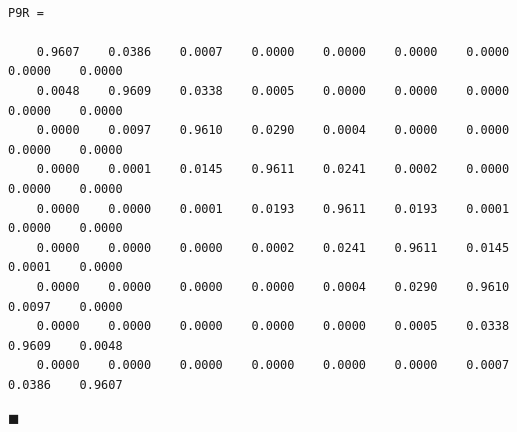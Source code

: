 \documentclass[10pt]{article}
\newcommand*{\QEDA}{\hfill\ensuremath{\blacksquare}}%
\newcommand\0{\mathbf{0}}
\newenvironment{sol}
    {\\[1em] {\color{magenta}\text{Resposta.}}
    }
    {{\color{blue!50!black}\QEDA}}
\begin{document}
\begin{enumerate}[label = 5.\arabic*., wide]
\begin{sol}
\begin{lstlisting}
P9R =

    0.9607    0.0386    0.0007    0.0000    0.0000    0.0000    0.0000    0.0000    0.0000
    0.0048    0.9609    0.0338    0.0005    0.0000    0.0000    0.0000    0.0000    0.0000
    0.0000    0.0097    0.9610    0.0290    0.0004    0.0000    0.0000    0.0000    0.0000
    0.0000    0.0001    0.0145    0.9611    0.0241    0.0002    0.0000    0.0000    0.0000
    0.0000    0.0000    0.0001    0.0193    0.9611    0.0193    0.0001    0.0000    0.0000
    0.0000    0.0000    0.0000    0.0002    0.0241    0.9611    0.0145    0.0001    0.0000
    0.0000    0.0000    0.0000    0.0000    0.0004    0.0290    0.9610    0.0097    0.0000
    0.0000    0.0000    0.0000    0.0000    0.0000    0.0005    0.0338    0.9609    0.0048
    0.0000    0.0000    0.0000    0.0000    0.0000    0.0000    0.0007    0.0386    0.9607
\end{lstlisting}
\end{sol}


\end{enumerate}
\end{document}
